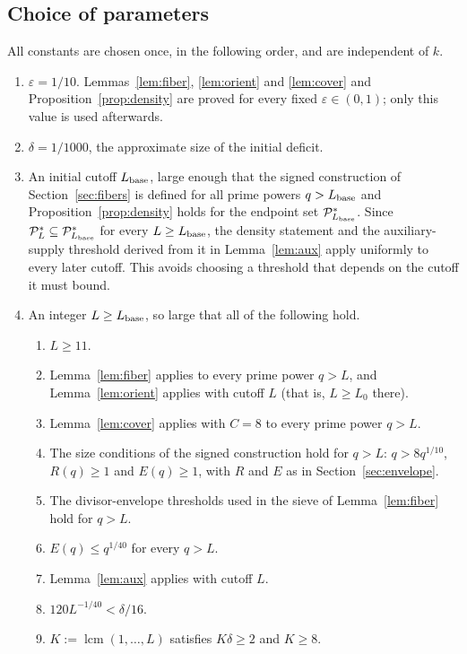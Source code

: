 \documentclass[11pt,letterpaper]{article}
\numberwithin{equation}{section}
\theoremstyle{plain}
\theoremstyle{remark}
\newcommand{\cP}{\mathcal P}
\newcommand{\lcm}{\operatorname{lcm}}
\begin{document}
\subsection{Choice of parameters}\label{sec:params}

All constants are chosen once, in the following order, and are independent of $k$.

\begin{enumerate}
\item $\varepsilon=1/10$. Lemmas~\ref{lem:fiber}, \ref{lem:orient} and \ref{lem:cover} and Proposition~\ref{prop:density} are proved for every fixed $\varepsilon\in(0,1)$; only this value is used afterwards.
\item $\delta=1/1000$, the approximate size of the initial deficit.
\item An initial cutoff $L_{\rm base}$, large enough that the signed construction of Section~\ref{sec:fibers} is defined for all prime powers $q>L_{\rm base}$ and Proposition~\ref{prop:density} holds for the endpoint set $\cP^*_{L_{\rm base}}$. Since $\cP^*_L\subseteq\cP^*_{L_{\rm base}}$ for every $L\ge L_{\rm base}$, the density statement and the auxiliary-supply threshold derived from it in Lemma~\ref{lem:aux} apply uniformly to every later cutoff. This avoids choosing a threshold that depends on the cutoff it must bound.
\item An integer $L\ge L_{\rm base}$, so large that all of the following hold.
\begin{enumerate}
\item[(a)] $L\ge11$.
\item[(b)] Lemma~\ref{lem:fiber} applies to every prime power $q>L$, and Lemma~\ref{lem:orient} applies with cutoff $L$ (that is, $L\ge L_0$ there).
\item[(c)] Lemma~\ref{lem:cover} applies with $C=8$ to every prime power $q>L$.
\item[(d)] The size conditions of the signed construction hold for $q>L$: $q>8q^{1/10}$, $R(q)\ge1$ and $E(q)\ge1$, with $R$ and $E$ as in Section~\ref{sec:envelope}.
\item[(e)] The divisor-envelope thresholds used in the sieve of Lemma~\ref{lem:fiber} hold for $q>L$.
\item[(f)] $E(q)\le q^{1/40}$ for every $q>L$.
\item[(g)] Lemma~\ref{lem:aux} applies with cutoff $L$.
\item[(h)] $120L^{-1/40}<\delta/16$.
\item[(i)] $K:=\lcm(1,\ldots,L)$ satisfies $K\delta\ge2$ and $K\ge8$.

\end{enumerate}
\end{enumerate}
\end{document}
